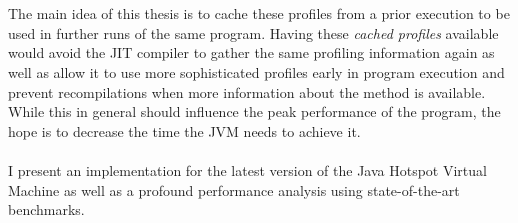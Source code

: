 \\\\
The main idea of this thesis is to cache these profiles from a prior execution to be used in further runs of the same program. 
Having these \textit{cached profiles} available would avoid the JIT compiler to gather the same profiling information again as well as allow it to use more sophisticated profiles early in program execution and prevent recompilations when more information about the method is available. While this in general should influence the peak performance of the program, the hope is to decrease the time the JVM needs to achieve it.
\\\\
I present an implementation for the latest version of the Java Hotspot Virtual Machine as well as a profound performance analysis using state-of-the-art benchmarks.
